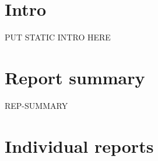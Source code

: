 \documentclass{article}%
\begin{document}
%
\normalsize%
\section{Intro}%
\label{sec:Intro}%
PUT STATIC INTRO HERE%

\section{Report summary}%
\label{sec:Summary}%
REP-SUMMARY%

\section{Individual reports}%
\label{sec:Reports}%

\newline%

\newline%


%
\end{document}
